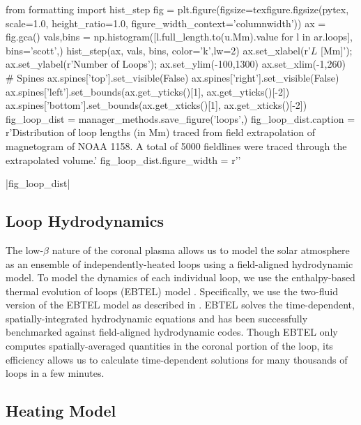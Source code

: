 \begin{pycode}
from formatting import hist_step
fig = plt.figure(figsize=texfigure.figsize(pytex, scale=1.0, height_ratio=1.0,
                                           figure_width_context='columnwidth'))
ax = fig.gca()
vals,bins = np.histogram([l.full_length.to(u.Mm).value for l in ar.loops], bins='scott',)
hist_step(ax, vals, bins, color='k',lw=2)
ax.set_xlabel(r'$L$ [Mm]');
ax.set_ylabel(r'Number of Loops');
ax.set_ylim(-100,1300)
ax.set_xlim(-1,260)
# Spines
ax.spines['top'].set_visible(False)
ax.spines['right'].set_visible(False)
ax.spines['left'].set_bounds(ax.get_yticks()[1], ax.get_yticks()[-2])
ax.spines['bottom'].set_bounds(ax.get_xticks()[1], ax.get_xticks()[-2])
fig_loop_dist = manager_methods.save_figure('loops',)
fig_loop_dist.caption = r'Distribution of loop lengths (in Mm) traced from field extrapolation of magnetogram of NOAA 1158. A total of 5000 fieldlines were traced through the extrapolated volume.'
fig_loop_dist.figure_width = r'\columnwidth'
\end{pycode}
|fig_loop_dist|

\subsection{Loop Hydrodynamics}\label{loops}

The low-$\beta$ nature of the coronal plasma allows us to model the solar atmosphere as an ensemble of independently-heated loops using a field-aligned hydrodynamic model. To model the dynamics of each individual loop, we use the enthalpy-based thermal evolution of loops (EBTEL) model \citep{klimchuk_highly_2008,cargill_enthalpy-based_2012}. Specifically, we use the two-fluid version of the EBTEL model as described in \citep{barnes_inference_2016}. EBTEL solves the time-dependent, spatially-integrated hydrodynamic equations and has been successfully benchmarked against field-aligned hydrodynamic codes. Though EBTEL only computes spatially-averaged quantities in the coronal portion of the loop, its efficiency allows us to calculate time-dependent solutions for many thousands of loops in a few minutes.

\subsection{Heating Model}\label{heating}

